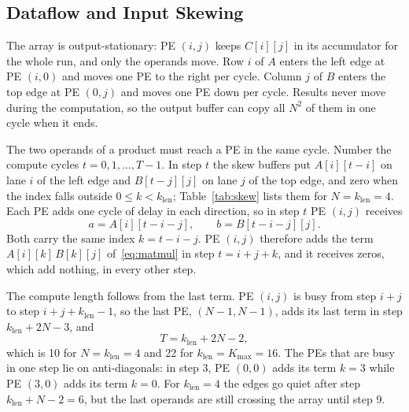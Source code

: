 
\subsection{Dataflow and Input Skewing}
The array is output-stationary: PE $(i,j)$ keeps $C[i][j]$ in its accumulator for the whole run, and only the operands move. Row $i$ of $A$ enters the left edge at PE $(i,0)$ and moves one PE to the right per cycle. Column $j$ of $B$ enters the top edge at PE $(0,j)$ and moves one PE down per cycle. Results never move during the computation, so the output buffer can copy all $N^2$ of them in one cycle when it ends.

The two operands of a product must reach a PE in the same cycle. Number the compute cycles $t = 0, 1, \ldots, T-1$. In step $t$ the skew buffers put $A[i][t-i]$ on lane $i$ of the left edge and $B[t-j][j]$ on lane $j$ of the top edge, and zero when the index falls outside $0 \le k < k_{\mathrm{len}}$; Table~\ref{tab:skew} lists them for $N = k_{\mathrm{len}} = 4$. Each PE adds one cycle of delay in each direction, so in step $t$ PE $(i,j)$ receives
\begin{equation}
a = A[i][t-i-j], \qquad b = B[t-i-j][j].
\end{equation}
Both carry the same index $k = t - i - j$. PE $(i,j)$ therefore adds the term $A[i][k]\,B[k][j]$ of~\eqref{eq:matmul} in step $t = i + j + k$, and it receives zeros, which add nothing, in every other step.

The compute length follows from the last term. PE $(i,j)$ is busy from step $i+j$ to step $i+j+k_{\mathrm{len}}-1$, so the last PE, $(N{-}1,N{-}1)$, adds its last term in step $k_{\mathrm{len}} + 2N - 3$, and
\begin{equation}
T = k_{\mathrm{len}} + 2N - 2,
\end{equation}
which is 10 for $N = k_{\mathrm{len}} = 4$ and 22 for $k_{\mathrm{len}} = K_{\max} = 16$. The PEs that are busy in one step lie on anti-diagonals: in step 3, PE $(0,0)$ adds its term $k = 3$ while PE $(3,0)$ adds its term $k = 0$. For $k_{\mathrm{len}} = 4$ the edges go quiet after step $k_{\mathrm{len}} + N - 2 = 6$, but the last operands are still crossing the array until step 9.

